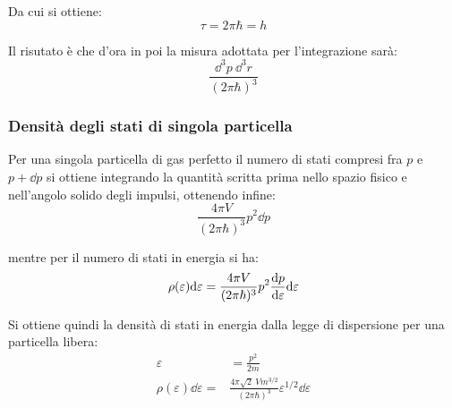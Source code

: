\noindent Da cui si ottiene:
\begin{equation*}
\tau = 2 \pi \hbar = h
\end{equation*}

Il risutato è che d'ora in poi la misura adottata per l'integrazione sarà:
\begin{equation*}
	\frac{\dd^3p~\dd^3r}{(2\pi\hbar)^3} 
\end{equation*}

\subsubsection{Densità degli stati di singola particella}

Per una singola particella di gas perfetto il numero di stati compresi fra $p$ e $p + \dd p$ si ottiene integrando la quantità scritta prima nello spazio fisico e nell'angolo solido degli impulsi, ottenendo infine:
\begin{equation*}
\frac{4\pi V}{(2\pi \hbar)^3}p^2 \dd p
\end{equation*}

\noindent mentre per il numero di stati in energia si ha:
\begin{equation*}
\rho(\varepsilon) \dd \varepsilon = \frac{4\pi V}{(2\pi \hbar)^3}p^2 \derivative{p}{\varepsilon}\dd \varepsilon
\end{equation*}

Si ottiene quindi la densità di stati in energia dalla legge di dispersione per una particella libera:
\begin{align*}
	\varepsilon &= \frac{p^2}{2m}\\
	\rho(\varepsilon) \dd \varepsilon = &\frac{4\pi \sqrt{2}~V m^{3/2}}{(2\pi \hbar)^3}\varepsilon^{1/2}\dd \varepsilon
\end{align*}

